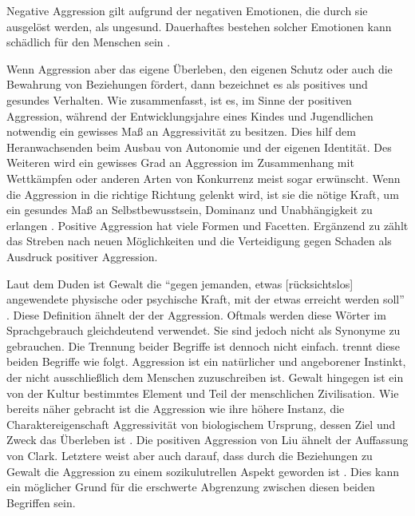 Negative Aggression gilt aufgrund der negativen Emotionen, die durch sie ausgelöst werden, als ungesund. Dauerhaftes bestehen solcher Emotionen kann  schädlich für den Menschen sein \parencite{Aggression}.

Wenn Aggression aber das eigene Überleben, den eigenen Schutz oder auch die Bewahrung von Beziehungen fördert, dann bezeichnet \textcite{positive_aggression} 
es als positives und gesundes Verhalten. Wie \textcite{Aggression} zusammenfasst, ist es, im Sinne der positiven Aggression, während der Entwicklungsjahre eines 
Kindes und Jugendlichen notwendig ein gewisses Maß an Aggressivität zu besitzen. Dies hilf dem Heranwachsenden beim Ausbau von Autonomie und der eigenen Identität. Des Weiteren wird ein gewisses Grad an Aggression im Zusammenhang mit Wettkämpfen oder anderen Arten von Konkurrenz meist sogar erwünscht. Wenn die Aggression in die richtige Richtung gelenkt wird, ist sie die nötige Kraft, um ein gesundes Maß an Selbstbewusstsein, Dominanz und Unabhängigkeit zu erlangen \parencite{Aggression}. Positive Aggression hat viele Formen und Facetten. Ergänzend zu \textcite{positive_aggression} zählt \textcite{jack1999behind}
das Streben nach neuen Möglichkeiten und die Verteidigung gegen Schaden als Ausdruck positiver Aggression.

Laut dem Duden ist Gewalt die \enquote{gegen jemanden, etwas [rücksichtslos] angewendete physische oder psychische Kraft, mit der etwas erreicht werden soll} \parencite{Gewalt_Duden}. Diese Definition ähnelt der der Aggression. Oftmals werden diese Wörter im Sprachgebrauch gleichdeutend verwendet. Sie sind jedoch nicht als Synonyme zu gebrauchen. Die Trennung beider Begriffe ist dennoch nicht einfach. \textcite{Def_Aggressivität_vs_violence} trennt diese beiden Begriffe wie folgt. Aggression ist ein natürlicher und angeborener Instinkt, der nicht ausschließlich dem Menschen zuzuschreiben ist. Gewalt hingegen ist ein von der Kultur bestimmtes Element und Teil der menschlichen Zivilisation. Wie bereits näher gebracht ist die Aggression wie ihre höhere Instanz, die Charaktereigenschaft Aggressivität von biologischem Ursprung, dessen Ziel und Zweck das Überleben ist \parencite{Def_Aggressivität_vs_violence, Aggression}.
Die positiven Aggression von Liu ähnelt der Auffassung von Clark. Letztere weist aber auch darauf, dass durch die Beziehungen zu Gewalt die Aggression zu einem sozikulutrellen Aspekt geworden ist \parencite{Def_Aggressivität_vs_violence}.
Dies kann ein möglicher Grund für die erschwerte Abgrenzung zwischen diesen beiden
Begriffen sein. 

